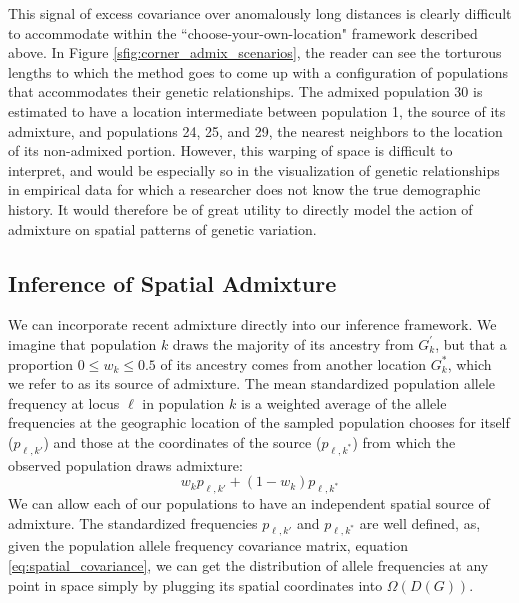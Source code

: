 \documentclass[12pt]{article}
\newcommand{\kadmixsource}[1]{{$G^{*}_{#1}$}}
\newcommand{\identifyadmixsource}[1]{{#1^{*}}}
\newcommand{\plr}[1]{{\it\color{green}{(#1)}}}
\begin{document}
This signal of excess covariance over anomalously long distances is clearly difficult to accommodate within the ``choose-your-own-location" framework described above.  In Figure \ref{sfig:corner_admix_scenarios}, the reader can see the torturous lengths to which the method goes to come up with a configuration of populations that accommodates their genetic relationships.  The admixed population 30 is estimated to have a location intermediate between population 1, the source of its admixture, and populations 24, 25, and 29, the nearest neighbors to the location of its non-admixed portion.  However, this warping of space is difficult to interpret, and would be especially so in the visualization of genetic relationships in empirical data for which a researcher does not know the true demographic history.  It would therefore be of great utility to directly model the action of admixture on spatial patterns of genetic variation.
\plr{wordy}

\subsection*{Inference of Spatial Admixture}
We can incorporate recent admixture directly into our inference framework.  We imagine that population $k$ draws the majority of its ancestry from $G^{\prime}_{k}$, but that a proportion $0 \leq w_k \leq 0.5$ of its ancestry comes from another location \kadmixsource{k}, which we refer to as its source of admixture. The mean standardized population allele frequency at locus $\ell$ in population $k$ is a weighted average of the \plr{standardized} allele frequencies at the geographic location of the sampled population chooses for itself ($p_{\ell,k'}$) and those at the coordinates of the source ($p_{\ell,\identifyadmixsource{k}}$) from which the observed population draws admixture:
\begin{equation}
w_k p_{\ell,k'} + (1-w_k) p_{\ell,\identifyadmixsource{k}} \label{eqn-admixedfreq}
\end{equation}
We can allow each of our populations to have an independent spatial source of admixture. The standardized frequencies $p_{\ell,k'}$ and $p_{\ell,\identifyadmixsource{k}} $ are well defined, as, given the population allele frequency covariance matrix, equation \ref{eq:spatial_covariance}, we can get the distribution of allele frequencies at any point in space simply by plugging its spatial coordinates into $\Omega(D(G))$.
\end{document}
